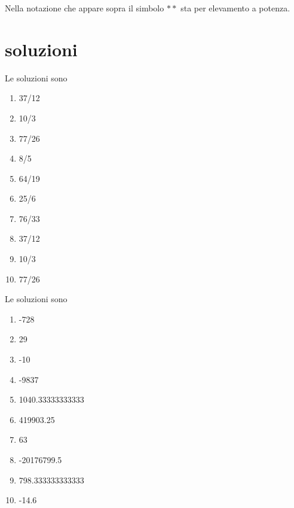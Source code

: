 \documentclass[onecolumn,11pt]{book}\usepackage[]{graphicx}\usepackage[]{color}
\begin{document}
Nella notazione che appare sopra il simbolo $**$ sta per elevamento a potenza.

\section{soluzioni}

Le soluzioni sono
\begin{enumerate}

\item  37/12
\item  10/3
\item  77/26
\item  8/5
\item  64/19
\item  25/6
\item  76/33
\item  37/12
\item  10/3
\item  77/26
\end{enumerate}


Le soluzioni sono
\begin{enumerate}
 \item 
-728 \item 
29 \item 
-10 \item 
-9837 \item 
1040.33333333333 \item 
419903.25 \item 
63 \item 
-20176799.5 \item 
798.333333333333 \item 
-14.6
\end{enumerate}
\end{document}
